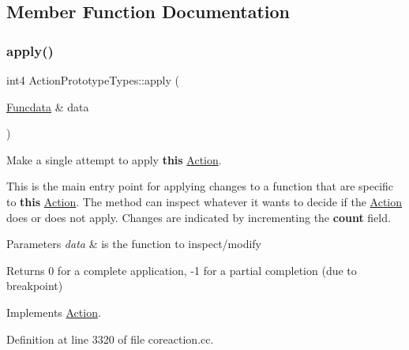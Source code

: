 \subsection{Member Function Documentation}
\mbox{\label{class_action_prototype_types_a4c4654505369c0d674f2260c313c76b3}} 
\subsubsection{\texorpdfstring{apply()}{apply()}}
{\footnotesize\ttfamily int4 Action\+Prototype\+Types\+::apply (\begin{DoxyParamCaption}\item[{\mbox{\hyperlink{class_funcdata}{Funcdata}} \&}]{data }\end{DoxyParamCaption})\hspace{0.3cm}{\ttfamily [virtual]}}



Make a single attempt to apply {\bfseries{this}} \mbox{\hyperlink{class_action}{Action}}. 

This is the main entry point for applying changes to a function that are specific to {\bfseries{this}} \mbox{\hyperlink{class_action}{Action}}. The method can inspect whatever it wants to decide if the \mbox{\hyperlink{class_action}{Action}} does or does not apply. Changes are indicated by incrementing the {\bfseries{count}} field. 
\begin{DoxyParams}{Parameters}
{\em data} & is the function to inspect/modify \\
\hline
\end{DoxyParams}
\begin{DoxyReturn}{Returns}
0 for a complete application, -\/1 for a partial completion (due to breakpoint) 
\end{DoxyReturn}


Implements \mbox{\hyperlink{class_action_aac1c3999d6c685b15f5d9765a4d04173}{Action}}.



Definition at line 3320 of file coreaction.\+cc.

